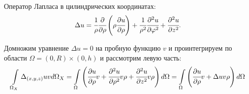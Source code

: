 \documentclass{report}
\begin{document}
Оператор Лапласа в цилиндрических координатах:
\begin{equation}
	\Delta u = \cfrac{1}{\rho}\cfrac{\partial}{\partial \rho}\left(\rho\cfrac{\partial u}{\partial \rho}\right) + \cfrac{1}{\rho^2}\cfrac{\partial^2u}{\partial \varphi^2}+\cfrac{\partial^2u}{\partial z^2}.
\end{equation}

Домножим уравнение $\Delta u = 0$ на пробную функцию $v$ и проинтегрируем по области $\Omega = (0,R)\times(0,h)$ и рассмотрим левую часть:
\begin{equation*}
\int\limits_{\Omega_{X}} \Delta_{(x,y,z)} u v d\Omega_{X} = \int\limits_{\Omega} \left( \cfrac{\partial u}{\partial \rho}v + \cfrac{\partial^2u}{\partial \rho^2}v\rho + \cfrac{\partial^2u}{\partial z^2}v\rho \right) d\Omega = \int\limits_{\Omega} \left( \cfrac{\partial u}{\partial \rho}v + \Delta u v\rho \right) d\Omega
\end{equation*}
\end{document}
